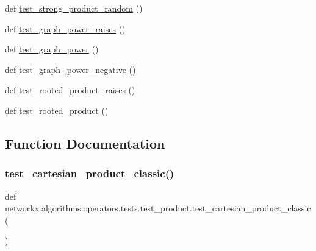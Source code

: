 \begin{DoxyCompactItemize}
\item 
def \hyperlink{namespacenetworkx_1_1algorithms_1_1operators_1_1tests_1_1test__product_a77c60867c5a63308a1fdc86c6372002f}{test\+\_\+strong\+\_\+product\+\_\+random} ()
\item 
def \hyperlink{namespacenetworkx_1_1algorithms_1_1operators_1_1tests_1_1test__product_a56e0b3d507eb63e528a88e86c5b141f8}{test\+\_\+graph\+\_\+power\+\_\+raises} ()
\item 
def \hyperlink{namespacenetworkx_1_1algorithms_1_1operators_1_1tests_1_1test__product_afab44805af17cf0b3142df03affacebc}{test\+\_\+graph\+\_\+power} ()
\item 
def \hyperlink{namespacenetworkx_1_1algorithms_1_1operators_1_1tests_1_1test__product_a7dfb9084b337707513ef15a12b816d78}{test\+\_\+graph\+\_\+power\+\_\+negative} ()
\item 
def \hyperlink{namespacenetworkx_1_1algorithms_1_1operators_1_1tests_1_1test__product_a5413d29a2604bdf8396587ca8323bf9f}{test\+\_\+rooted\+\_\+product\+\_\+raises} ()
\item 
def \hyperlink{namespacenetworkx_1_1algorithms_1_1operators_1_1tests_1_1test__product_a428de323ce18b92416e268137dacd615}{test\+\_\+rooted\+\_\+product} ()
\end{DoxyCompactItemize}


\subsection{Function Documentation}
\mbox{\label{namespacenetworkx_1_1algorithms_1_1operators_1_1tests_1_1test__product_a9e2140d012aab0f03ea0848cc1a39a73}} 
\subsubsection{\texorpdfstring{test\+\_\+cartesian\+\_\+product\+\_\+classic()}{test\_cartesian\_product\_classic()}}
{\footnotesize\ttfamily def networkx.\+algorithms.\+operators.\+tests.\+test\+\_\+product.\+test\+\_\+cartesian\+\_\+product\+\_\+classic (\begin{DoxyParamCaption}{ }\end{DoxyParamCaption})}

